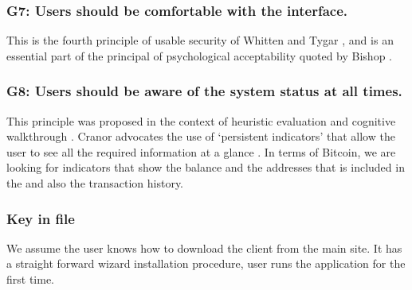 \subsubsection*{G7: Users should be comfortable with the interface.} This is the fourth principle of usable security of Whitten and Tygar \cite{johnny}, and is an essential part of the principal of psychological acceptability quoted by Bishop \cite{pa}. 


\subsubsection*{G8: Users should be aware of the system status at all times.} This principle was proposed in the context of heuristic evaluation \cite{cw} and cognitive walkthrough \cite{pvo}. Cranor advocates the use of `persistent indicators' that allow the user to see all the required information at a glance \cite{p3p}. In terms of Bitcoin, we are looking for indicators that show the balance and the addresses that is included in the \walletfile and also the transaction history.

\subsubsection{Key in file}
We assume the user knows how to download the client from the main site. It has a straight forward wizard installation procedure, user runs the application for the first time. %


